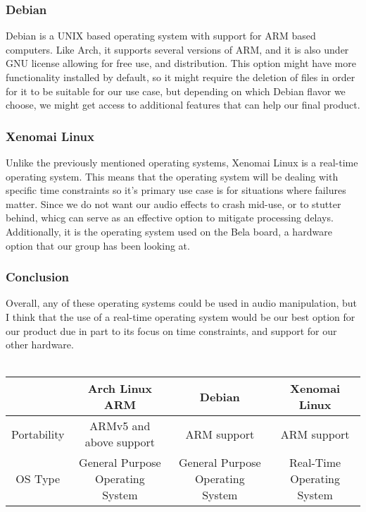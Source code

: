 \documentclass[onecolumn, draftclsnofoot,10pt, compsoc]{IEEEtran}
\begin{document}
        \subsubsection{Debian}
        Debian is a UNIX based operating system with support for ARM based computers. Like Arch, it supports several versions of ARM, and it is also under GNU license allowing for free use, and distribution. This option might have more functionality installed by default, so it might require the deletion of files in order for it to be suitable for our use case, but depending on which Debian flavor we choose, we might get access to additional features that can help our final product.
        
        \subsubsection{Xenomai Linux}
        Unlike the previously mentioned operating systems, Xenomai Linux is a real-time operating system. This means that the operating system will be dealing with specific time constraints so it's primary use case is for situations where failures matter. Since we do not want our audio effects to crash mid-use, or to stutter behind, whicg can serve as an effective option to mitigate processing delays. Additionally, it is the operating system used on the Bela board, a hardware option that our group has been looking at.

        \subsubsection{Conclusion}
        Overall, any of these operating systems could be used in audio manipulation, but I think that the use of a real-time operating system would be our best option for our product due in part to its focus on time constraints, and support for our other hardware.\\
        \\
        \begin{tabular}{c|c|c|c}
             & Arch Linux ARM & Debian & Xenomai Linux \\
            \hline
            Portability & ARMv5 and above support & ARM support & ARM support \\
            OS Type & General Purpose Operating System & General Purpose Operating System & Real-Time Operating System\\
            
        \end{tabular}
\end{document}
